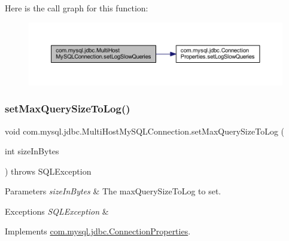 Here is the call graph for this function\+:
\nopagebreak
\begin{figure}[H]
\begin{center}
\leavevmode
\includegraphics[width=350pt]{classcom_1_1mysql_1_1jdbc_1_1_multi_host_my_s_q_l_connection_a89d164c3f8f46d2f95ec2b1eae60e344_cgraph}
\end{center}
\end{figure}
\mbox{\label{classcom_1_1mysql_1_1jdbc_1_1_multi_host_my_s_q_l_connection_af7d68fcc0013bf2144e290097365b6ea}} 
\subsubsection{\texorpdfstring{set\+Max\+Query\+Size\+To\+Log()}{setMaxQuerySizeToLog()}}
{\footnotesize\ttfamily void com.\+mysql.\+jdbc.\+Multi\+Host\+My\+S\+Q\+L\+Connection.\+set\+Max\+Query\+Size\+To\+Log (\begin{DoxyParamCaption}\item[{int}]{size\+In\+Bytes }\end{DoxyParamCaption}) throws S\+Q\+L\+Exception}


\begin{DoxyParams}{Parameters}
{\em size\+In\+Bytes} & The max\+Query\+Size\+To\+Log to set. \\
\hline
\end{DoxyParams}

\begin{DoxyExceptions}{Exceptions}
{\em S\+Q\+L\+Exception} & \\
\hline
\end{DoxyExceptions}


Implements \mbox{\hyperlink{interfacecom_1_1mysql_1_1jdbc_1_1_connection_properties_a65e15e4e1644fe1fb818777977237944}{com.\+mysql.\+jdbc.\+Connection\+Properties}}.

